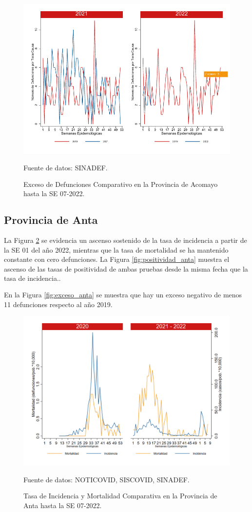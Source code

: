 \documentclass[12pt,a4paper,openany]{book}
\begin{document}
		\begin{figure}[h]
			\caption{Exceso de Defunciones Comparativo en la Provincia de Acomayo hasta la SE 07-2022.}\label{fig:exceso_acomayo}
			\begin{center}
				\includegraphics[width=0.7\linewidth]{../figuras/exceso_1.pdf}
			\end{center}
			{\footnotesize {Fuente de datos: SINADEF.}}
		\end{figure}
		
		\clearpage
		
		\subsection*{Provincia de Anta}
		\noindent La Figura \ref{fig:inc_mort_anta}  se evidencia un ascenso sostenido de la tasa de incidencia a partir de la SE 01 del año 2022, mientras que la tasa de mortalidad se ha mantenido constante con cero defunciones. 
		\noindent La Figura
		\ref{fig:positividad_anta} muestra el ascenso de las tasas de positividad de ambas pruebas desde la misma fecha que la tasa de incidencia.. 
		
		En la Figura \ref{fig:exceso_anta} se muestra que hay un exceso negativo de menos 11 defunciones respecto al año 2019.
		
		\begin{figure}[h]
			\caption{Tasa de Incidencia y Mortalidad Comparativa en la Provincia de Anta hasta la SE 07-2022.}\label{fig:inc_mort_anta}
			\begin{center}
				\includegraphics[width=0.7\linewidth]{../figuras/incidencia_mortalidad_20_21_2.png}
			\end{center}
			{\footnotesize {Fuente de datos: NOTICOVID, SISCOVID, SINADEF.}}
		\end{figure}
		
\end{document}
